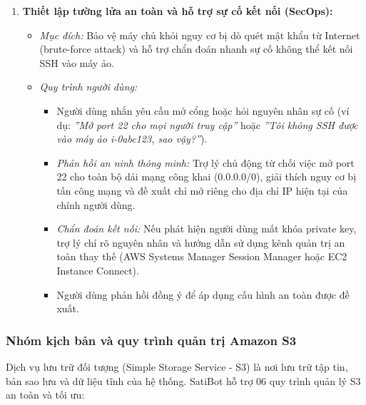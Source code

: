 \documentclass[a4paper,12pt]{article}
\begin{document}
\begin{enumerate}
  \item \textbf{Thiết lập tường lửa an toàn và hỗ trợ sự cố kết nối (SecOps):}
  \begin{itemize}
    \item \textit{Mục đích:} Bảo vệ máy chủ khỏi nguy cơ bị dò quét mật khẩu từ Internet (brute-force attack) và hỗ trợ chẩn đoán nhanh sự cố không thể kết nối SSH vào máy ảo.
    \item \textit{Quy trình người dùng:}
    \begin{itemize}
      \item Người dùng nhắn yêu cầu mở cổng hoặc hỏi nguyên nhân sự cố (ví dụ: \textit{''Mở port 22 cho mọi người truy cập''} hoặc \textit{''Tôi không SSH được vào máy ảo i-0abc123, sao vậy?''}).
      \item \textit{Phản hồi an ninh thông minh:} Trợ lý chủ động từ chối việc mở port 22 cho toàn bộ dải mạng công khai (0.0.0.0/0), giải thích nguy cơ bị tấn công mạng và đề xuất chỉ mở riêng cho địa chỉ IP hiện tại của chính người dùng.
      \item \textit{Chẩn đoán kết nối:} Nếu phát hiện người dùng mất khóa private key, trợ lý chỉ rõ nguyên nhân và hướng dẫn sử dụng kênh quản trị an toàn thay thế (AWS Systems Manager Session Manager hoặc EC2 Instance Connect).
      \item Người dùng phản hồi đồng ý để áp dụng cấu hình an toàn được đề xuất.
    \end{itemize}
  \end{itemize}
\end{enumerate}

\subsubsection{Nhóm kịch bản và quy trình quản trị Amazon S3}

Dịch vụ lưu trữ đối tượng (Simple Storage Service - S3) là nơi lưu trữ tập tin, bản sao lưu và dữ liệu tĩnh của hệ thống. SatiBot hỗ trợ 06 quy trình quản lý S3 an toàn và tối ưu:
\end{document}
